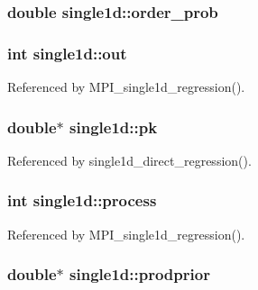\subsubsection[{\texorpdfstring{order\+\_\+prob}{order_prob}}]{\setlength{\rightskip}{0pt plus 5cm}double single1d\+::order\+\_\+prob}\hypertarget{structsingle1d_abbd3eb5dba3b0c7d2c5773b1b07a5ad6}{}\label{structsingle1d_abbd3eb5dba3b0c7d2c5773b1b07a5ad6}
\subsubsection[{\texorpdfstring{out}{out}}]{\setlength{\rightskip}{0pt plus 5cm}int single1d\+::out}\hypertarget{structsingle1d_a422c09cc991d96ed1229335722c7883e}{}\label{structsingle1d_a422c09cc991d96ed1229335722c7883e}


Referenced by M\+P\+I\+\_\+single1d\+\_\+regression().

\subsubsection[{\texorpdfstring{pk}{pk}}]{\setlength{\rightskip}{0pt plus 5cm}double$\ast$ single1d\+::pk}\hypertarget{structsingle1d_a01401cf7bb4ae9f5248a5a22d9d3c31d}{}\label{structsingle1d_a01401cf7bb4ae9f5248a5a22d9d3c31d}


Referenced by single1d\+\_\+direct\+\_\+regression().

\subsubsection[{\texorpdfstring{process}{process}}]{\setlength{\rightskip}{0pt plus 5cm}int single1d\+::process}\hypertarget{structsingle1d_ad4ffb2d4180386092485f854850fb4ed}{}\label{structsingle1d_ad4ffb2d4180386092485f854850fb4ed}


Referenced by M\+P\+I\+\_\+single1d\+\_\+regression().

\subsubsection[{\texorpdfstring{prodprior}{prodprior}}]{\setlength{\rightskip}{0pt plus 5cm}double$\ast$ single1d\+::prodprior}\hypertarget{structsingle1d_ad19769e913ffae67be78d12260c8da65}{}\label{structsingle1d_ad19769e913ffae67be78d12260c8da65}
